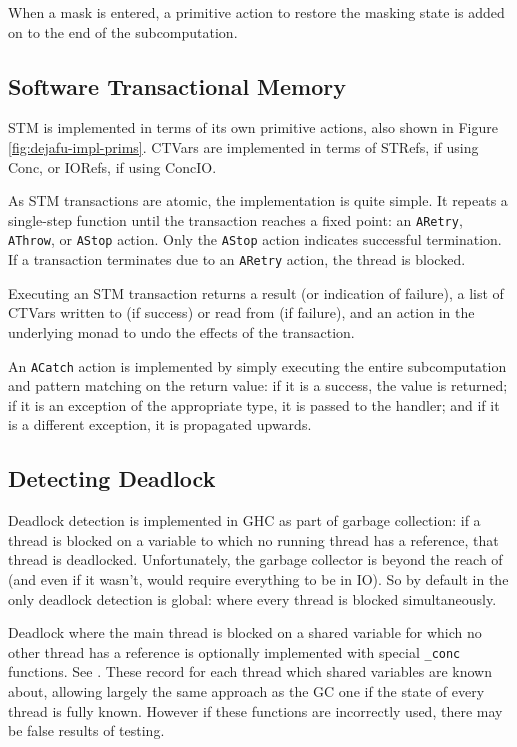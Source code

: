 When a mask is entered, a primitive action to restore the masking
state is added on to the end of the subcomputation.

\subsection*{Software Transactional Memory}
\label{sec:dejafu-impl-stm}

STM is implemented in terms of its own primitive actions, also shown
in Figure \ref{fig:dejafu-impl-prims}. CTVars are implemented in terms
of STRefs, if using Conc, or IORefs, if using ConcIO.

As STM transactions are atomic, the implementation is quite simple. It
repeats a single-step function until the transaction reaches a fixed
point: an \texttt{ARetry}, \texttt{AThrow}, or \texttt{AStop}
action. Only the \texttt{AStop} action indicates successful
termination. If a transaction terminates due to an \texttt{ARetry}
action, the thread is blocked.

Executing an STM transaction returns a result (or indication of
failure), a list of CTVars written to (if success) or read from (if
failure), and an action in the underlying monad to undo the effects of
the transaction.

An \texttt{ACatch} action is implemented by simply executing the
entire subcomputation and pattern matching on the return value: if it
is a success, the value is returned; if it is an exception of the
appropriate type, it is passed to the handler; and if it is a
different exception, it is propagated upwards.

\subsection*{Detecting Deadlock}
\label{sec:dejafu-impl-tests}

Deadlock detection is implemented in GHC as part of garbage
collection: if a thread is blocked on a variable to which no running
thread has a reference, that thread is deadlocked. Unfortunately, the
garbage collector is beyond the reach of \dejafu{} (and even if it
wasn't, would require everything to be in IO). So by default in
\dejafu{} the only deadlock detection is global: where every thread is
blocked simultaneously.

Deadlock where the main thread is blocked on a shared variable for
which no other thread has a reference is optionally implemented with
special \texttt{\_conc} functions. See . These record
for each thread which shared variables are known about, allowing
largely the same approach as the GC one if the state of every thread
is fully known. However if these functions are incorrectly used, there
may be false results of testing.

